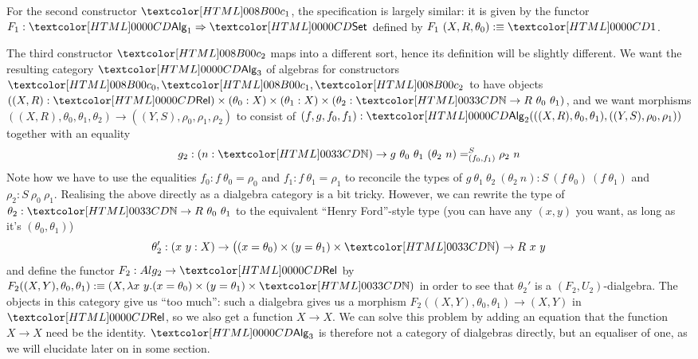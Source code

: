 For the second constructor $\Aci$, the specification is largely
similar: it is given by the functor $F_1 : \Func{\Alg_1}{\Set}$
defined by $F_1\ (X, R, \theta_0) \ddefeq \unitty$.

The third constructor $\Bcii$ maps into a different sort, hence its
definition will be slightly different. We want the resulting category
$\Alg_3$ of algebras for constructors $\Aco, \Aci, \Bcii$ to have
objects
$((X,R) : \Rel) \times (\theta_0 : X) \times (\theta_1 : X) \times
(\theta_2 : \natty \to R\ \theta_0\ \theta_1)$,
and we want morphisms
$((X,R),\theta_0,\theta_1,\theta_2) \to ((Y,S),\rho_0,\rho_1,\rho_2)$
to consist of
$(f,g,f_0,f_1) :
\Alg_2(((X,R),\theta_0,\theta_1),((Y,S),\rho_0,\rho_1))$
together with an equality
$$
g_2 : (n : \natty)  \to \pathover{S}{(f_0,f_1)}{g\ \theta_0\ \theta_1\ (\theta_2\ n)}{\rho_2\ n}
$$
Note how we have to use the equalities $f_0 : f\ \theta_0 = \rho_0$ and
$f_1 : f\ \theta_1 = \rho_1$ to reconcile the types of
$g\ \theta_1\ \theta_2\ (\theta_2\ n) : S\ (f\ \theta_0)\ (f\
\theta_1)$ and $\rho_2 : S\ \rho_0\ \rho_1$.
%
Realising the above directly as a dialgebra category is a bit
tricky. However, we can rewrite the type of
$\theta_2 : \natty \to R\ \theta_0\ \theta_1$ to the equivalent ``Henry
Ford''-style type (you can have any $(x, y)$ you want, as long as it's
$(\theta_0, \theta_1)$)\
\[
\theta_2' : (x\ y : X) \to \big((x = \theta_0) \times (y = \theta_1) \times \natty\big) \to R\ x\ y 
\]
and define the functor $F_2 : Alg_2 \to \Rel$ by
$F_2 ((X,Y),\theta_0,\theta_1) \ddefeq (X , \lambda x\ y . (x =
\theta_0) \times (y = \theta_1) \times \natty)$
in order to see that $\theta_2'$ is a $(F_2,U_2)$-dialgebra. The
objects in this category give us ``too much'': such a dialgebra gives
us a morphism $F_2((X,Y),\theta_0,\theta_1) \to (X,Y)$ in $\Rel$, so
we also get a function $X \to X$. We can solve this problem by adding
an equation that the function $X \to X$ need be the identity. $\Alg_3$
is therefore not a category of dialgebras directly, but an equaliser
of one, as we will elucidate later on in some section.

